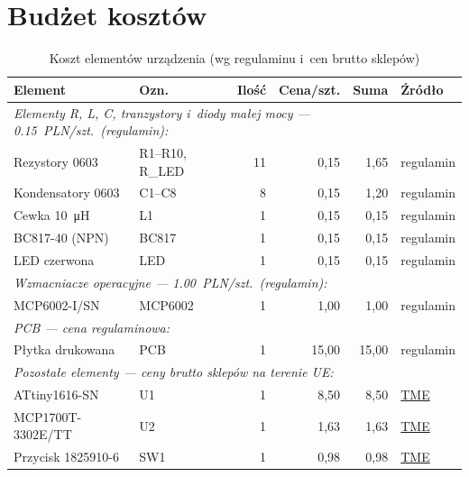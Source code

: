 \documentclass[a4paper,11pt]{article}
\begin{document}
\section{Budżet kosztów}
\label{sec:koszty}

\begin{table}[H]
    \centering
    \caption{Koszt elementów urządzenia (wg regulaminu i~cen brutto sklepów)}
    \label{tab:koszty}
    \begin{tabular}{llrrrl}
        \toprule
        \textbf{Element} & \textbf{Ozn.} & \textbf{Ilość} &
        \textbf{Cena/szt.} & \textbf{Suma} & \textbf{Źródło} \\
        \midrule
        \multicolumn{6}{l}{\textit{Elementy R, L, C, tranzystory i~diody małej mocy --- \SI{0,15}{PLN}/szt.\ (regulamin):}} \\
        \midrule
        Rezystory 0603 & R1--R10, R\_LED & 11 & 0,15 & 1,65 & regulamin \\
        Kondensatory 0603 & C1--C8 & 8 & 0,15 & 1,20 & regulamin \\
        Cewka \SI{10}{\micro\henry} & L1 & 1 & 0,15 & 0,15 & regulamin \\
        BC817-40 (NPN) & BC817 & 1 & 0,15 & 0,15 & regulamin \\
        LED czerwona & LED & 1 & 0,15 & 0,15 & regulamin \\
        \midrule
        \multicolumn{6}{l}{\textit{Wzmacniacze operacyjne --- \SI{1,00}{PLN}/szt.\ (regulamin):}} \\
        \midrule
        MCP6002-I/SN & MCP6002 & 1 & 1,00 & 1,00 & regulamin \\
        \midrule
        \multicolumn{6}{l}{\textit{PCB --- cena regulaminowa:}} \\
        \midrule
        Płytka drukowana & PCB & 1 & 15,00 & 15,00 & regulamin \\
        \midrule
        \multicolumn{6}{l}{\textit{Pozostałe elementy --- ceny brutto sklepów na terenie UE:}} \\
        \midrule
        ATtiny1616-SN & U1 & 1 & 8,50 & 8,50 &
            \href{https://www.tme.eu/pl/details/attiny1616-snr/mikrokontrolery-microchip-avr-8-bit/microchip-technology/}{TME} \\
        MCP1700T-3302E/TT & U2 & 1 & 1,63 & 1,63 &
            \href{https://www.tme.eu/pl/details/mcp1700t-3302e_tt/stabilizatory-ldo-nienastawne/microchip-technology/}{TME} \\
        Przycisk 1825910-6 & SW1 & 1 & 0,98 & 0,98 &
            \href{https://www.tme.eu/pl/details/1825910-6/przelaczniki-tact/te-connectivity/}{TME} \\

\end{tabular}
\end{table}
\end{document}
